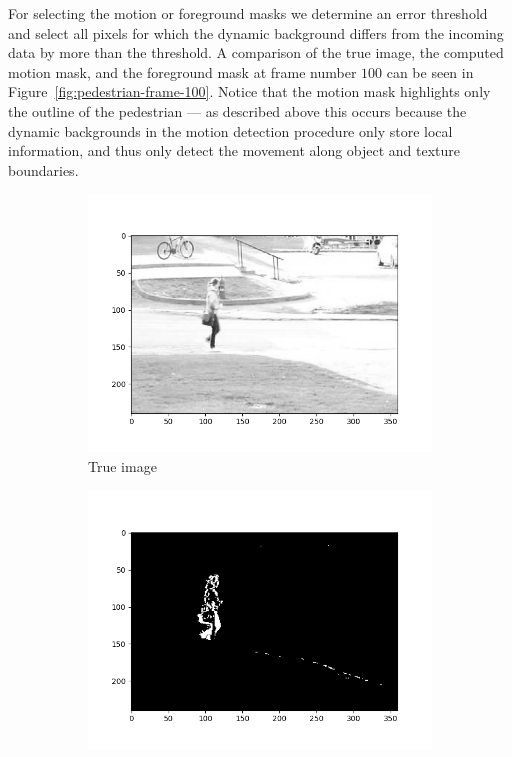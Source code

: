 For selecting the motion or foreground masks we determine an error threshold and select all pixels for which the dynamic background differs from the incoming data by more than the threshold. A comparison of the true image, the computed motion mask, and the foreground mask at frame number $100$ can be seen in Figure~\ref{fig:pedestrian-frame-100}. Notice that the motion mask highlights only the outline of the pedestrian --- as described above this occurs because the dynamic backgrounds in the motion detection procedure only store local information, and thus only detect the movement along object and texture boundaries.

\begin{figure}[!ht]
    \centering
    \begin{subfigure}{.3\textwidth}
        \includegraphics[width=\textwidth]{pedestrian_frame_100.png}
        \caption{True image}
    \end{subfigure}
    \hfill
    \begin{subfigure}{.3\textwidth}
        \includegraphics[width=\textwidth]{pedestrian_motion_frame_100.png}

\end{subfigure}
\end{figure}
